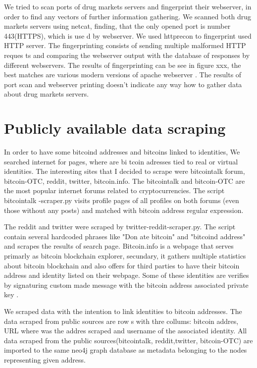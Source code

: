 \documentclass[
  digital, %
  table,   %
  lof,     %
  lot,     %
  oneside
]{fithesis3}
\begin{document}
We tried to scan ports of drug markets servers and fingerprint their webserver, in order to find any vectors of further 
information gathering.
We scanned both drug markets servers using netcat, finding, that the only opened port is number 443(HTTPS), which is use
d by webserver.
We used httprecon to fingerprint used HTTP server. The fingerprinting consists of sending multiple malformed HTTP reques
ts and comparing the webserver output with the database of responses by different webservers.
The results of fingerprinting can be see in figure xxx, the best matches are various modern versions of apache webserver
.
The results of port scan and webserver printing doesn't indicate any way how to gather data about drug markets servers.


\section{Publicly available data scraping}
In order to have some bitcoind addresses and bitcoins linked to identities, We searched internet for pages, where are bi
tcoin adresses tied to real or virtual identities.
The interesting sites that I decided to scrape were bitcointalk forum, bitcoin-OTC, reddit, twitter, bitcoin.info.
The bitcointalk and bitcoin-OTC are the most popular internet forums related to cryptocurrencies. The script bitcointalk
-scraper.py visits profile pages of all profiles on both forums (even those without any posts)
 and matched with bitcoin address regular expression.
 
The reddit and twitter were scraped by twitter-reddit-scraper.py. The script contain several hardcoded phrases like "Don
ate bitcoin" and "bitcoind address" and scrapes the results of search page.
Bitcoin.info is a webpage that serves primarly as bitcoin blockchain explorer, secundary,
it gathers multiple statistics about bitcoin blockchain and also offers for third parties to have their bitcoin address 
and identity listed on their webpage.
Some of these identities are verifies by signaturing custom made message with the bitcoin address associated private key
.

We scraped data with the intention to link identities to bitcoin addresses. The data scraped from public sources are row
s with thre collums: bitcoin addres, URL where was the addres scraped and username of the associated identity.
All data scraped from the public sources(bitcointalk, reddit,twitter, bitcoin-OTC) are imported to the same neo4j graph 
database as metadata belonging to the nodes representing given address.
\end{document}
